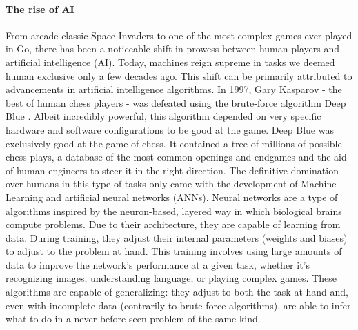 \documentclass[11pt]{article}
\begin{document}
\paragraph{The rise of AI}

From arcade classic Space Invaders to one of the most complex games ever played in Go, there has been a noticeable shift in prowess between human players and artificial intelligence (AI). Today, machines reign supreme in tasks we deemed human exclusive only a few decades ago. This shift can be primarily attributed to advancements in artificial intelligence algorithms. In 1997, Gary Kasparov - the best of human chess players - was defeated using the brute-force algorithm Deep Blue \cite{hsu2002behind}. Albeit incredibly powerful, this algorithm depended on very specific hardware and software configurations to be good at the game. Deep Blue was exclusively good at the game of chess. It contained a tree of millions of possible chess plays, a database of the most common openings and endgames and the aid of human engineers to steer it in the right direction. The definitive domination over humans in this type of tasks only came with the development of Machine Learning and artificial neural networks (ANNs). Neural networks are a type of algorithms inspired by the neuron-based, layered way in which biological brains compute problems. Due to their architecture, they are capable of learning from data. During training, they adjust their internal parameters (weights and biases) to adjust to the problem at hand. This training involves using large amounts of data to improve the network's performance at a given task, whether it's recognizing images, understanding language, or playing complex games. These algorithms are capable of generalizing: they adjust to both the task at hand and, even with incomplete data (contrarily to brute-force algorithms), are able to infer what to do in a never before seen problem of the same kind.
\end{document}
